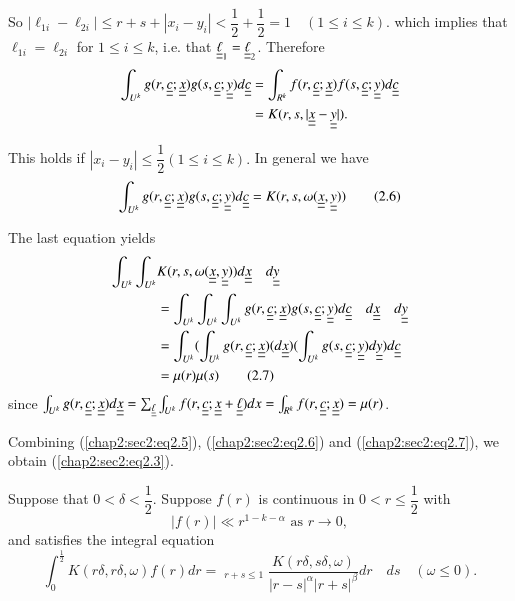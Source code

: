 So $|\ell_{1i} - \ell_{2i}| \leq r+s+|x_{i}-y_{i}|< \dfrac{1}{2} + \dfrac{1}{2} = 1 \quad (1 \leq i \leq k)$. which implies that $\ell_{1i} = \ell_{2i}$ for $1 \leq i \leq k$, i.e. that $\underline{\underline{\ell}}_{1} = \underline{\underline{\ell}}_{2}$. Therefore
\begin{align*}
\int_{U^{k}} g(r, \underline{\underline{c}} ; \underline{\underline{x}}) g(s, \underline{\underline{c}} ; \underline{\underline{y}}) d\underline{\underline{c}} & = \int_{R^{k}} f(r, \underline{\underline{c}} ; \underline{\underline{x}}) f(s, \underline{\underline{c}} ; \underline{\underline{y}}) d\underline{\underline{c}}\\
& = K(r, s, |\underline{\underline{x}} - \underline{\underline{y}}|).
\end{align*}

This holds if $|x_{i} - y_{i}| \leq \dfrac{1}{2} (1 \leq i \leq k).$ In general we have
\begin{equation*}
\int_{U^{k}} g(r, \underline{\underline{c}} ; \underline{\underline{x}}) g(s, \underline{\underline{c}} ; \underline{\underline{y}}) d\underline{\underline{c}} = K(r, s, \omega(\underline{\underline{x}}, \underline{\underline{y}}))\tag{2.6}\label{chap2:sec2:eq2.6}
\end{equation*}

The last equation yields
\begin{align*}
\int_{U^{k}} \int_{U^{k}} & K(r, s, \omega(\underline{\underline{x}}, \underline{\underline{y}})) d\underline{\underline{x}} \quad d\underline{\underline{y}}\\ 
& = \int_{U^{k}} \int_{U^{k}} \int_{U^{k}} g(r, \underline{\underline{c}} ; \underline{\underline{x}}) g(s, \underline{\underline{c}} ; \underline{\underline{y}}) d\underline{\underline{c}} \quad d\underline{\underline{x}} \quad d\underline{\underline{y}}\\
& = \int_{U^{k}} (\int_{U^{k}} g(r, \underline{\underline{c}} ; \underline{\underline{x}}) (d\underline{\underline{x}}) (\int_{U^{k}} g(s, \underline{\underline{c}} ; \underline{\underline{y}}) d\underline{\underline{y}}) d\underline{\underline{c}}\\
& = \mu (r) \mu (s)\tag{2.7}\label{chap2:sec2:eq2.7}
\end{align*}
since $\int_{U^{k}} g(r, \underline{\underline{c}} ; \underline{\underline{x}}) d \underline{\underline{x}} = \sum_{\underline{\underline{\ell}}} \int_{U^{k}} f(r, \underline{\underline{c}} ; \underline{\underline{x}} + \underline{\underline{\ell}}) dx = \int_{R^{k}} f(r, \underline{\underline{c}} ; \underline{\underline{x}}) = \mu(r)$.

Combining (\ref{chap2:sec2:eq2.5}), (\ref{chap2:sec2:eq2.6}) and (\ref{chap2:sec2:eq2.7}), we obtain (\ref{chap2:sec2:eq2.3}).

\begin{lemma}\label{chap2:sec2:lem2A}
Suppose that $0 < \delta < \dfrac{1}{2}$. Suppose $f(r)$ is continuous in $0 < r \leq \dfrac{1}{2}$ with
$$
|f(r)| \ll r^{1-k-\alpha} \text{ as } r \to 0,
$$
and satisfies the integral equation
\begin{equation*}
\int_{0}^{\frac{1}{2}} K(r\delta, r\delta, \omega)f(r) dr = \mathop{\int_{0}^{1} \int_{0}^{1}}_{r+s \leq 1} \frac{K(r\delta, s\delta, \omega)}{|r-s|^{\alpha} |r+s|^{\beta}}dr \quad ds \quad (\omega \leq 0).\tag{2.8}\label{chap2:sec2:eq2.8}
\end{equation*}
\end{lemma}

